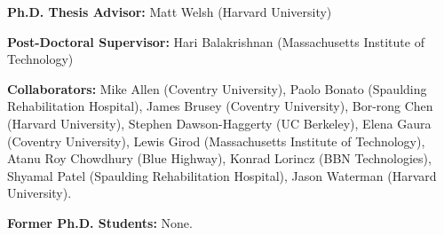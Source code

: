 \documentclass[11pt,letterpaper]{article}
\begin{document}
\textbf{Ph.D. Thesis Advisor:} Matt Welsh (Harvard University)

\vspace{0.10in}

\textbf{Post-Doctoral Supervisor:} Hari Balakrishnan (Massachusetts Institute
of Technology)

\vspace{0.10in}

\textbf{Collaborators:} Mike Allen (Coventry University), Paolo Bonato
(Spaulding Rehabilitation Hospital), James Brusey (Coventry University),
Bor-rong Chen (Harvard University), Stephen Dawson-Haggerty (UC Berkeley),
Elena Gaura (Coventry University), Lewis Girod (Massachusetts Institute of
Technology), Atanu Roy Chowdhury (Blue Highway), Konrad Lorincz (BBN
Technologies), Shyamal Patel (Spaulding Rehabilitation Hospital), Jason
Waterman (Harvard University).

\vspace{0.10in}

\textbf{Former Ph.D. Students:} None.
\end{document}
